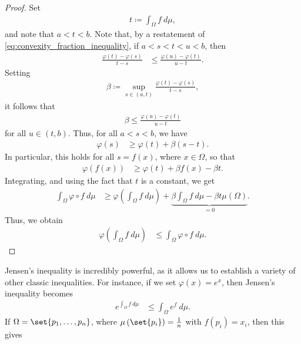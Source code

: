 \documentclass[10pt]{mypackage}
\begin{document}
\begin{proof}
  Set
  \begin{align*}
    t\coloneq \int_{\Omega}^{} f\:d\mu,
  \end{align*}
  and note that $a < t < b$. Note that, by a restatement of \eqref{eq:convexity_fraction_inequality}, if $a < s < t < u < b$, then
  \begin{align*}
    \frac{\varphi\left( t \right) - \varphi\left( s \right)}{t-s} &\leq \frac{\varphi\left( u \right)- \varphi\left( t \right)}{u-t}.
  \end{align*}
  Setting
  \begin{align*}
    \beta\coloneq \sup_{s\in (a,t)} \frac{\varphi\left( t \right) - \varphi\left( s \right)}{t-s},
  \end{align*}
  it follows that
  \begin{align*}
    \beta \leq \frac{\varphi\left( u \right)-\varphi\left( t \right)}{u-t}
  \end{align*}
  for all $u\in (t,b)$. Thus, for all $a < s < b$, we have
  \begin{align*}
    \varphi\left( s \right) &\geq \varphi\left( t \right) + \beta\left( s-t \right).
  \end{align*}
  In particular, this holds for all $s = f(x)$, where $x\in \Omega$, so that
  \begin{align*}
    \varphi\left( f\left( x \right) \right) &\geq \varphi\left( t \right) + \beta f(x) - \beta t.
  \end{align*}
  Integrating, and using the fact that $t$ is a constant, we get
  \begin{align*}
    \int_{\Omega}^{} \varphi\circ f\:d\mu &\geq \varphi\left( \int_{\Omega}^{} f\:d\mu \right) + \underbrace{\beta \int_{\Omega}^{} f\:d\mu - \beta t\mu\left( \Omega \right)}_{=0}.
  \end{align*}
  Thus, we obtain
  \begin{align*}
    \varphi\left( \int_{\Omega}^{} f\:d\mu \right) &\leq \int_{\Omega}^{} \varphi\circ f\:d\mu.
  \end{align*}
\end{proof}
Jensen's inequality is incredibly powerful, as it allows us to establish a variety of other classic inequalities. For instance, if we set $\varphi(x) = e^x$, then Jensen's inequality becomes
\begin{align*}
  e^{\int_{\Omega}^{} f\:d\mu} &\leq \int_{\Omega}^{} e^{f}\:d\mu.
\end{align*}
If $\Omega = \set{p_1,\dots,p_n}$, where $\mu\left( \set{p_i} \right) = \frac{1}{n}$ with $f\left(p_i\right) = x_i$, then this gives
\end{document}
